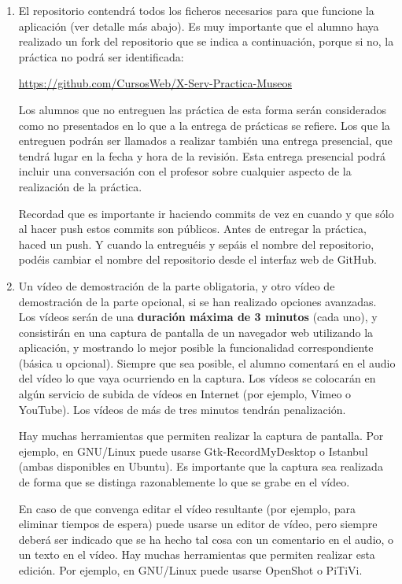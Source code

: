 \begin{enumerate}
  \item El repositorio contendrá todos los ficheros necesarios para que funcione la aplicación (ver detalle más abajo). Es muy importante que el alumno haya realizado un fork del repositorio que se indica a continuación, porque si no, la práctica no podrá ser identificada: 

\url{https://github.com/CursosWeb/X-Serv-Practica-Museos}

Los alumnos que no entreguen las práctica de esta forma serán considerados como no presentados en lo que a la entrega de prácticas se refiere. Los que la entreguen podrán ser llamados a realizar también una entrega presencial, que tendrá lugar en la fecha y hora de la revisión. Esta entrega presencial podrá incluir una conversación con el profesor sobre cualquier aspecto de la realización de la práctica.

Recordad que es importante ir haciendo commits de vez en cuando y que sólo al hacer push estos commits son públicos. Antes de entregar la práctica, haced un push. Y cuando la entreguéis y sepáis el nombre del repositorio, podéis cambiar el nombre del repositorio desde el interfaz web de GitHub. 
 
 \item Un vídeo de demostración de la parte obligatoria, y otro vídeo de demostración de la parte opcional, si se han realizado opciones avanzadas. Los vídeos serán de una {\bf duración máxima de 3 minutos} (cada uno), y consistirán en una captura de pantalla de un navegador web utilizando la aplicación, y mostrando lo mejor posible la funcionalidad correspondiente (básica u opcional). Siempre que sea posible, el alumno comentará en el audio del vídeo lo que vaya ocurriendo en la captura. Los vídeos se colocarán en algún servicio de subida de vídeos en Internet (por ejemplo, Vimeo o YouTube). Los vídeos de más de tres minutos tendrán penalización.

Hay muchas herramientas que permiten realizar la captura de pantalla. Por ejemplo, en GNU/Linux puede usarse Gtk-RecordMyDesktop o Istanbul (ambas disponibles en Ubuntu). Es importante que la captura sea realizada de forma que se distinga razonablemente lo que se grabe en el vídeo.

En caso de que convenga editar el vídeo resultante (por ejemplo, para eliminar tiempos de espera) puede usarse un editor de vídeo, pero siempre deberá ser indicado que se ha hecho tal cosa con un comentario en el audio, o un texto en el vídeo. Hay muchas herramientas que permiten realizar esta edición. Por ejemplo, en GNU/Linux puede usarse OpenShot o PiTiVi.


\end{enumerate}
